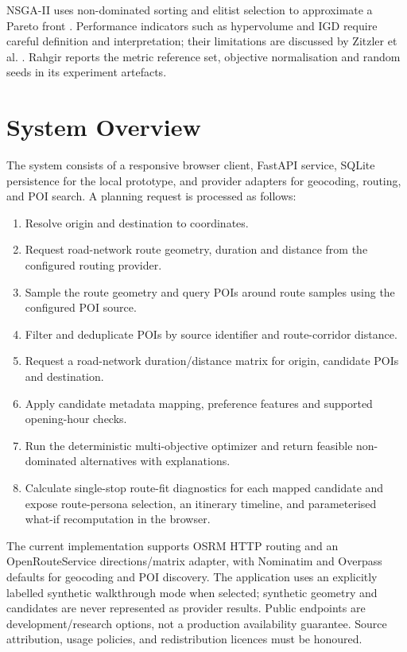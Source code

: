 \documentclass[10pt,conference]{IEEEtran}
\begin{document}
NSGA-II uses non-dominated sorting and elitist selection to approximate a Pareto front \cite{deb2002}. Performance indicators such as hypervolume and IGD require careful definition and interpretation; their limitations are discussed by Zitzler et al. \cite{zitzler2003}. Rahgir reports the metric reference set, objective normalisation and random seeds in its experiment artefacts.

\section{System Overview}
The system consists of a responsive browser client, FastAPI service, SQLite persistence for the local prototype, and provider adapters for geocoding, routing, and POI search. A planning request is processed as follows:
\begin{enumerate}
\item Resolve origin and destination to coordinates.
\item Request road-network route geometry, duration and distance from the configured routing provider.
\item Sample the route geometry and query POIs around route samples using the configured POI source.
\item Filter and deduplicate POIs by source identifier and route-corridor distance.
\item Request a road-network duration/distance matrix for origin, candidate POIs and destination.
\item Apply candidate metadata mapping, preference features and supported opening-hour checks.
\item Run the deterministic multi-objective optimizer and return feasible non-dominated alternatives with explanations.
\item Calculate single-stop route-fit diagnostics for each mapped candidate and expose route-persona selection, an itinerary timeline, and parameterised what-if recomputation in the browser.
\end{enumerate}

The current implementation supports OSRM HTTP routing and an OpenRouteService directions/matrix adapter, with Nominatim and Overpass defaults for geocoding and POI discovery. The application uses an explicitly labelled synthetic walkthrough mode when selected; synthetic geometry and candidates are never represented as provider results. Public endpoints are development/research options, not a production availability guarantee. Source attribution, usage policies, and redistribution licences must be honoured.
\end{document}
